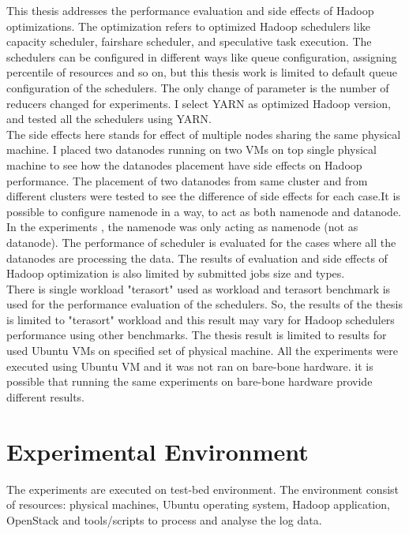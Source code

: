  This thesis addresses the performance evaluation and side effects of Hadoop optimizations. The optimization refers to optimized Hadoop schedulers like capacity scheduler, fairshare scheduler, and speculative task execution. The schedulers can be configured in different ways like queue configuration, assigning percentile of resources and so on, but this thesis work is limited to default queue configuration of the schedulers. The only change of parameter is the number of reducers changed for experiments. I select YARN‌ as optimized Hadoop version, and tested all the schedulers  using YARN. \\

The side effects here stands for effect of multiple nodes sharing the same physical machine. I placed two datanodes running on two VMs on top single physical machine to see how the datanodes placement have side effects on Hadoop performance. The placement of two datanodes from same cluster and from different clusters were tested to see the difference of side effects for each case.It is possible to configure namenode in a way, to act as both namenode and datanode. In the experiments , the namenode was only acting as namenode (not as datanode). The performance of scheduler is evaluated for the cases where all the datanodes are processing the data. The results of evaluation and side effects of Hadoop optimization is also limited by submitted jobs size and types.\\

There is single workload "terasort" used as workload and terasort benchmark is used for the performance evaluation of the schedulers. So, the results of the thesis is limited to "terasort" workload and this result may vary for Hadoop schedulers performance using other benchmarks. The thesis result is limited to results for used Ubuntu VMs on specified set of physical machine.  All the experiments were executed using Ubuntu VM and it was not ran on bare-bone hardware. it is possible that running the same experiments on bare-bone hardware provide different results.\\



\section{Experimental Environment}

The experiments are executed on test-bed environment. The environment consist of resources: physical machines, Ubuntu operating system, Hadoop application, OpenStack and tools/scripts to process and analyse the log data.\\


